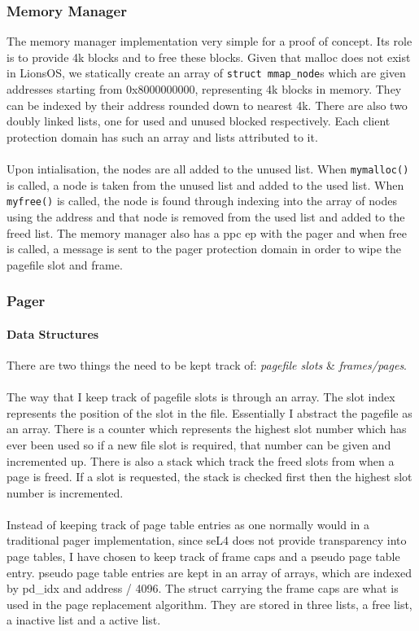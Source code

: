 \documentclass{article}
\begin{document}
\subsubsection{Memory Manager}
The memory manager implementation very simple for a proof of concept. Its role is to provide 4k blocks and to free these blocks. Given that malloc does not exist in LionsOS, we statically create an array of \texttt{struct mmap\_node}s which are given addresses starting from 0x8000000000, representing 4k blocks in memory. They can be indexed by their address rounded down to nearest 4k. There are also two doubly linked lists, one for used and unused blocked respectively. Each client protection domain has such an array and lists attributed to it.
\\\\
Upon intialisation, the nodes are all added to the unused list. When \texttt{mymalloc()} is called, a node is taken from the unused list and added to the used list. When \texttt{myfree()} is called, the node is found through indexing into the array of nodes using the address and that node is removed from the used list and added to the freed list. The memory manager also has a ppc ep with the pager and when free is called, a message is sent to the pager protection domain in order to wipe the pagefile slot and frame.
\subsubsection{Pager}
\paragraph{Data Structures}
There are two things the need to be kept track of: \textit{pagefile slots} \& \textit{frames/pages}.\\\\
The way that I keep track of pagefile slots is through an array. The slot index represents the position of the slot in the file. Essentially I abstract the pagefile as an array. There is a counter which represents the highest slot number which has ever been used so if a new file slot is required, that number can be given and incremented up. There is also a stack which track the freed slots from when a page is freed. If a slot is requested, the stack is checked first then the highest slot number is incremented.
\\\\
Instead of keeping track of page table entries as one normally would in a traditional pager implementation, since seL4 does not provide transparency into page tables, I have chosen to keep track of frame caps and a pseudo page table entry. pseudo page table entries are kept in an array of arrays, which are indexed by pd\_idx and address / 4096. The struct carrying the frame caps are what is used in the page replacement algorithm. They are stored in three lists, a free list, a inactive list and a active list.
\end{document}
